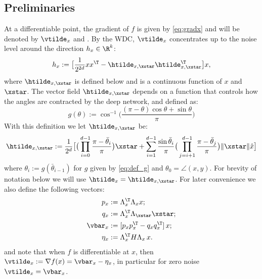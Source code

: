 
\subsection{Preliminaries}\label{subsec:prelim}

At a differentiable point, the gradient of $f$ is given by \eqref{eq:gradx} and will be denoted by $\vtilde_x$ and .
By the WDC, $\vtilde_x$ concentrates up to the 
noise level around the direction $h_x \in \R^k$:
\begin{equation} \label{eq:h_def}
h_x := \big[ \frac{1}{2^{2d}} x x^\T - \htilde_{x,\xstar} \htilde_{x,\xstar}^\T \big] x,
\end{equation}
where $\htilde_{x,\xstar}$ is defined below and
is a continuous function of $x$ and $\xstar$. The vector field  $\htilde_{x,\xstar}$ depends on a function that controls how the 
angles are contracted by the deep network, and defined as:
\begin{equation}\label{eq:def_g}
g(\theta) := \cos^{-1}\big( \frac{(\pi - \theta) \cos \theta + \sin \theta}{\pi} \big)
\end{equation}
With this definition we let $\htilde_{x,\xstar}$ be:
\[
\htilde_{x,\xstar} := \frac{1}{2^d} \big[ \big(\prod_{i=0}^{d-1} \frac{\pi - \bar{\theta}_i}{\pi} \big) \xstar + \sum_{i=1}^{d-1} \frac{\sin \bar{\theta}_i }{\pi}   \big(\prod_{j=i+1}^{d-1} \frac{\pi - \bar{\theta}_j}{\pi}\big) {\|\xstar\|} \hat{x} \big]
\]
where $\theta_i := g(\bar{\theta}_{i-1})$ for $g$ given by \eqref{eq:def_g} and $\theta_0 = \angle(x,y)$. For brevity of notation below we will use $\htilde_x = \htilde_{x,\xstar}$. For later convenience we also  define the following vectors:
\begin{equation*}
\begin{aligned}
p_x &:= \Lambda_x^\T \Lambda_x x; \\
q_x &:= \Lambda_x^\T \Lambda_\xstar  \xstar; \\
\vbar_x &:=  [p_x p_x^\T - q_x q_x^\T] \,x; \\
\eta_x &:= \Lambda_x^\T H \Lambda_x \, x.
\end{aligned}
\end{equation*}
and note that when $f$ is differentiable at $x$, then $\vtilde_x:= \nabla f(x) = \vbar_x - \eta_x$, in particular for zero noise $\vtilde_x = \vbar_x$.

